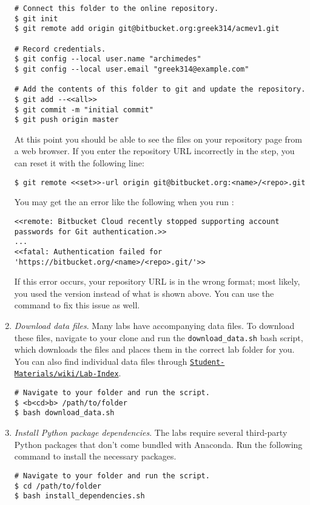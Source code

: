 \begin{enumerate}
\begin{lstlisting}
# Connect this folder to the online repository.
$ git init
$ git remote add origin git@bitbucket.org:greek314/acmev1.git

# Record credentials.
$ git config --local user.name "archimedes"
$ git config --local user.email "greek314@example.com"

# Add the contents of this folder to git and update the repository.
$ git add --<<all>>
$ git commit -m "initial commit"
$ git push origin master
\end{lstlisting}

At this point you should be able to see the files on your repository page from a web browser.
If you enter the repository URL incorrectly in the  step, you can reset it with the following line:
\begin{lstlisting}
$ git remote <<set>>-url origin git@bitbucket.org:<name>/<repo>.git
\end{lstlisting}
\begin{info}
You may get the an error like the following when you run :
\begin{lstlisting}
<<remote: Bitbucket Cloud recently stopped supporting account passwords for Git authentication.>>
...
<<fatal: Authentication failed for 'https://bitbucket.org/<name>/<repo>.git/'>>
\end{lstlisting}
If this error occurs, your repository URL is in the wrong format; most likely, you used the  version instead of what is shown above.
You can use the  command to fix this issue as well.
\end{info}

\item \emph{Download data files}.
\label{step:download-data}
Many labs have accompanying data files.
To download these files, navigate to your clone and run the \texttt{download\_data.sh} bash script, which downloads the files and places them in the correct lab folder for you.
You can also find individual data files through \href{https://github.com/Foundations-of-Applied-Mathematics/Student-Materials/wiki/Lab-Index}{\texttt{Student-Materials/wiki/Lab-Index}}.

\begin{lstlisting}
# Navigate to your folder and run the script.
$ <b<cd>b> /path/to/folder
$ bash download_data.sh
\end{lstlisting}

\item \emph{Install Python package dependencies}.
\label{step:install-dependencies}
The labs require several third-party Python packages that don't come bundled with Anaconda.
Run the following command to install the necessary packages.
\begin{lstlisting}
# Navigate to your folder and run the script.
$ cd /path/to/folder
$ bash install_dependencies.sh
\end{lstlisting}


\end{enumerate}
